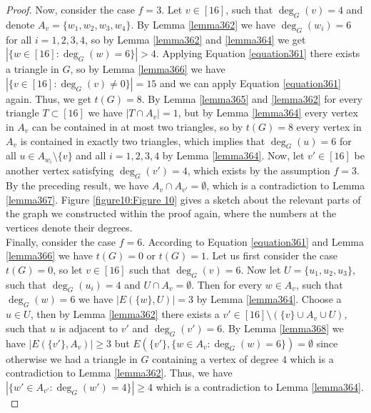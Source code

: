 \begin{thm}
\begin{proof}


Now, consider the case \(f=3\). Let \(v\in [16]\), such that \(\deg_G(v)=4\) and denote \(A_v=\{w_1,w_2,w_3,w_4\}\). By Lemma \ref{lemma362} we have \(\deg_G(w_i)=6\) for all \(i=1,2,3,4\), so by Lemma \ref{lemma362} and \ref{lemma364} we get \(|\{w\in [16]:\deg_G(w)=6\}|>4\). Applying Equation \ref{equation361} there exists a triangle in \(G\), so by Lemma \ref{lemma366} we have\\
\(|\{v\in [16]:\deg_G(v)\neq 0\}|=15\) and we can apply Equation \ref{equation361} again. Thus, we get \(t(G)=8\). By Lemma \ref{lemma365} and \ref{lemma362} for every triangle \(T\subset [16]\) we have \(|T\cap A_v|=1\), but by Lemma \ref{lemma364} every vertex in \(A_v\) can be contained in at most two triangles, so by \(t(G)=8\) every vertex in \(A_v\) is contained in exactly two triangles, which implies that \(\deg_G(u)=6\) for all \(u\in A_{w_i}\setminus\{v\}\) and all \(i=1,2,3,4\) by Lemma \ref{lemma364}. Now, let \(v'\in [16]\) be another vertex satisfying \(\deg_G(v')=4\), which exists by the assumption \(f=3\). By the preceding result, we have \(A_v\cap A_{v'}=\emptyset\), which is a contradiction to Lemma \ref{lemma367}. Figure \ref{figure10:Figure 10} gives a sketch about the relevant parts of the graph we constructed within the proof again, where the numbers at the vertices denote their degrees.\\



Finally, consider the case \(f=6\). According to Equation \ref{equation361} and Lemma \ref{lemma366} we have \(t(G)=0\) or \(t(G)=1\). Let us first consider the case \(t(G)=0\), so let \(v\in [16]\) such that \(\deg_G(v)=6\). Now let \(U=\{u_1,u_2,u_3\}\), such that \(\deg_G(u_i)=4\) and \(U\cap A_v=\emptyset\). Then for every \(w\in A_v\), such that \(\deg_G(w)=6\) we have \(|E(\{w\},U)|=3\) by Lemma \ref{lemma364}. Choose a \(u\in U\), then by Lemma \ref{lemma362} there exists a \(v'\in [16]\setminus (\{v\}\cup A_v\cup U)\), such that \(u\) is adjacent to \(v'\) and \(\deg_G(v')=6\). By Lemma \ref{lemma368} we have \(|E(\{v'\},A_v)|\geq 3\) but \(E(\{v'\},\{w\in A_v:\deg_G(w)=6\})=\emptyset\) since otherwise we had a triangle in \(G\) containing a vertex of degree \(4\) which is a contradiction to Lemma \ref{lemma362}. Thus, we have \(|\{w'\in A_{v'}:\deg_G(w')=4\}|\geq 4\) which is a contradiction to Lemma \ref{lemma364}.\\




\end{proof}
\end{thm}
